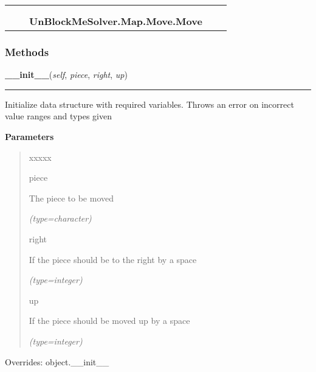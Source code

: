     \label{UnBlockMeSolver:Map:Move:Move}
\begin{tabular}{cccccc}
\multicolumn{2}{r}{\settowidth{\BCL}{object}\multirow{2}{\BCL}{object}}
&&
  \\\cline{3-3}
  &&\multicolumn{1}{c|}{}
&&
  \\
&&\multicolumn{2}{l}{\textbf{UnBlockMeSolver.Map.Move.Move}}
\end{tabular}



  \subsubsection{Methods}

    \vspace{0.5ex}

\hspace{.8\funcindent}\begin{boxedminipage}{\funcwidth}

    \raggedright \textbf{\_\_init\_\_}(\textit{self}, \textit{piece}, \textit{right}, \textit{up})

    \vspace{-1.5ex}

    \rule{\textwidth}{0.5\fboxrule}
\setlength{\parskip}{2ex}
    Initialize data structure with required variables. Throws an error on 
    incorrect value ranges and types given

\setlength{\parskip}{1ex}
      \textbf{Parameters}
      \vspace{-1ex}

      \begin{quote}
        \begin{Ventry}{xxxxx}

          \item[piece]

          The piece to be moved

            {\it (type=character)}

          \item[right]

          If the piece should be to the right by a space

            {\it (type=integer)}

          \item[up]

          If the piece should be moved up by a space

            {\it (type=integer)}

        \end{Ventry}

      \end{quote}

      Overrides: object.\_\_init\_\_

    \end{boxedminipage}

